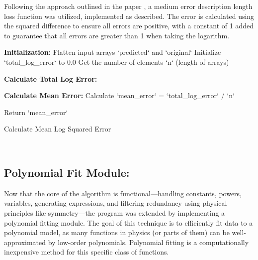 \documentclass{article}
\begin{document}
Following the approach outlined in the paper \cite{Liddle2009}, a medium error description length loss function was utilized, implemented as described. The error is calculated using the squared difference to ensure all errors are positive, with a constant of 1 added to guarantee that all errors are greater than 1 when taking the logarithm.\\





\begin{algorithm}[H]
\SetAlgoLined
{}

\textbf{Initialization:}\;
Flatten input arrays `predicted` and `original`\;
Initialize `total_log_error` to 0.0\;
Get the number of elements `n` (length of arrays)\;

\textbf{Calculate Total Log Error:}\;

\textbf{Calculate Mean Error:}\;
Calculate `mean_error` = `total_log_error` / `n`\;

Return `mean_error`\;

\caption{Calculate Mean Log Squared Error}
\label{alg:mean_log_squared_error} %
\end{algorithm}\\





\subsection{Polynomial Fit Module: }

Now that the core of the algorithm is functional—handling constants, powers, variables, generating expressions, and filtering redundancy using physical principles like symmetry—the program was extended by implementing a polynomial fitting module. The goal of this technique is to efficiently fit data to a polynomial model, as many functions in physics (or parts of them) can be well-approximated by low-order polynomials. Polynomial fitting is a computationally inexpensive method for this specific class of functions.\
\end{document}
